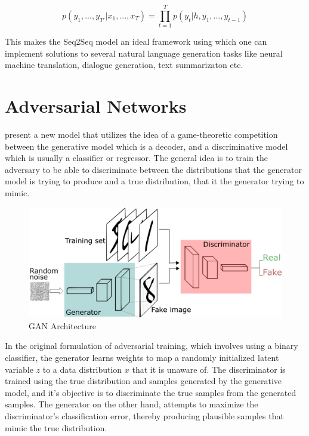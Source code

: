 \begin{equation}
	p(y_1, ... , y_{T′} | x_1, ... , x_T) =	\prod_{t=1}^T p(y_t | h, y_1, ... , y_{t−1})
\end{equation}

This makes the Seq2Seq model an ideal framework using which one can implement solutions to several natural language generation tasks like neural machine translation, dialogue generation, text summarizaton etc.

\section{Adversarial Networks}

\cite{goodfellow2014generative} present a new model that utilizes the idea of a game-theoretic competition between the generative model which is a decoder, and a discriminative model which is usually a classifier or regressor. The general idea is to train the adversary to be able to discriminate between the distributions that the generator model is trying to produce and a true distribution, that it the generator trying to mimic.

\begin{figure}[ht]
	\centering
	\includegraphics[width=\textwidth]{images/gans}
	\caption{\label{fig:gans} GAN Architecture}
\end{figure}

In the original formulation of adversarial training, which involves using a binary classifier, the generator learns weights to map a randomly initialized latent variable $z$ to a data distribution $x$ that it is unaware of. The discriminator is trained using the true distribution and samples generated by the generative model, and it's objective is to discriminate the true samples from the generated samples. The generator on the other hand, attempts to maximize the discriminator's classification error, thereby producing plausible samples that mimic the true distribution.

